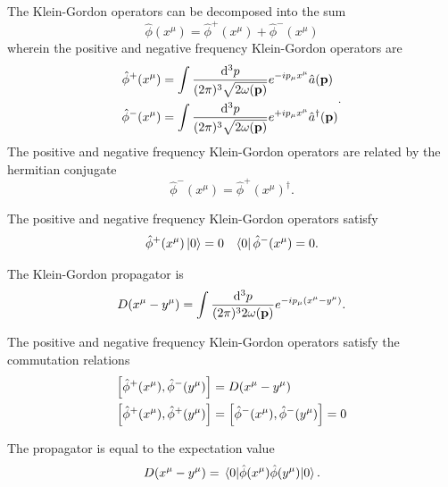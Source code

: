 \begin{definition}
	The Klein-Gordon operators can be decomposed into the sum
	\begin{equation}
		\hat\phi(x^\mu)
		=
		\hat\phi^+(x^\mu)
		+
		\hat\phi^-(x^\mu)
	\end{equation}
	wherein the positive and negative frequency Klein-Gordon operators are
	\begin{equation}
		\begin{split}
			\hat\phi^+(x^\mu)
			&=
			\int\frac{\dd[3]{p}}{(2\pi)^3\sqrt{2\omega(\vb{p})}}
			e^{-ip_\mu x^\mu}
			\hat{a}(\vb{p})
			\\
			\hat\phi^-(x^\mu)
			&=
			\int\frac{\dd[3]{p}}{(2\pi)^3\sqrt{2\omega(\vb{p})}}
			e^{+ip_\mu x^\mu}
			\hat{a}^\dagger(\vb{p})
		\end{split}
		\label{eq:qkg_positive_negative_frequency}
		.
	\end{equation}
	The positive and negative frequency Klein-Gordon operators are related by the hermitian conjugate
	\begin{equation}
		\hat\phi^-(x^\mu)
		=
		\hat\phi^+(x^\mu)^\dagger
		.
	\end{equation}
\end{definition}
\begin{corollary}
	The positive and negative frequency Klein-Gordon operators satisfy
	\begin{align}
		\hat\phi^+(x^\mu)
		\ket{0}
		=
		0
		&&
		\bra{0}
		\hat\phi^-(x^\mu)
		=
		0
		.
	\end{align}
\end{corollary}
\begin{definition}
	The Klein-Gordon propagator is
	\begin{equation}
		D(x^\mu-y^\mu)
		=
		\int\frac{\dd[3]{p}}{(2\pi)^32\omega(\vb{p})}
		e^{-ip_\mu (x^\mu-y^\mu)}
		.
	\end{equation}
\end{definition}
\begin{lemma}\label{thm:qkg_pn_comm}
	The positive and negative frequency Klein-Gordon operators satisfy the commutation relations
	\begin{align}
		\comm{\hat\phi^+(x^\mu)}{\hat\phi^-(y^\mu)}
		&=
		D(x^\mu-y^\mu)
		\\
		\comm{\hat\phi^+(x^\mu)}{\hat\phi^+(y^\mu)}
		&=
		\comm{\hat\phi^-(x^\mu)}{\hat\phi^-(y^\mu)}
		=
		0
	\end{align}
\end{lemma}
\begin{lemma}\label{thm:qkg_propagator_correlation_function}
	The propagator is equal to the expectation value
	\begin{equation}
		D(x^\mu-y^\mu)
		=
		\expval{\hat\phi(x^\mu)\hat\phi(y^\mu)}{0}
		.
	\end{equation}
\end{lemma}